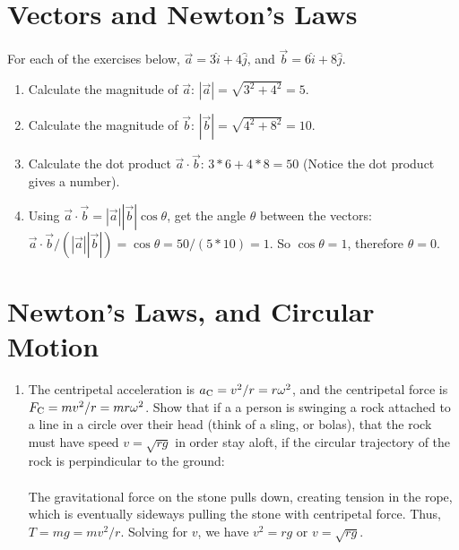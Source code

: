 \documentclass[10pt]{article}
\begin{document}
\maketitle

\section{Vectors and Newton's Laws}
For each of the exercises below, $\vec{a} = 3\hat{i} + 4\hat{j}$, and $\vec{b} = 6\hat{i}+8\hat{j}$.
\begin{enumerate}
\item Calculate the magnitude of $\vec{a}$: $|\vec{a}| = \sqrt{3^2+4^2} = 5$.
\item Calculate the magnitude of $\vec{b}$: $|\vec{b}| = \sqrt{4^2+8^2} = 10$.
\item Calculate the dot product $\vec{a} \cdot \vec{b}$: $3*6 + 4*8 = 50$ (Notice the dot product gives a number).
\item Using $\vec{a}\cdot\vec{b} = |\vec{a}||\vec{b}|\cos\theta$, get the angle $\theta$ between the vectors: $\vec{a}\cdot\vec{b}/(|\vec{a}||\vec{b}|) = \cos\theta = 50/(5*10) = 1$.  So $\cos\theta = 1$, therefore $\theta = 0$.
\end{enumerate}
\section{Newton's Laws, and Circular Motion}
\begin{enumerate}
\item The centripetal acceleration is $a_{\rm C} = v^2/r = r\omega^2$, and the centripetal force is $F_{\rm C} = mv^2/r = mr\omega^2$.  Show that if a a person is swinging a rock attached to a line in a circle over their head (think of a sling, or bolas), that the rock must have speed $v = \sqrt{rg}$ in order stay aloft, if the circular trajectory of the rock is perpindicular to the ground: \\ \\
The gravitational force on the stone pulls down, creating tension in the rope, which is eventually sideways pulling the stone with centripetal force.  Thus, $T = mg = mv^2/r$. Solving for $v$, we have $v^2 = rg$ or $v = \sqrt{rg}$.  
\end{enumerate}
\end{document}
